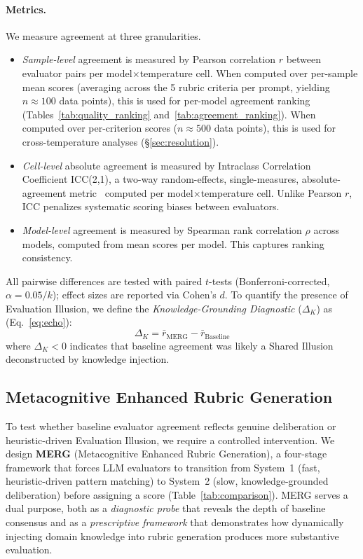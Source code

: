 \documentclass{article}
\begin{document}
\paragraph{Metrics.} We measure agreement at three granularities.
\begin{itemize}
    \item \textit{Sample-level} agreement is measured by Pearson correlation $r$ between evaluator pairs per model$\times$temperature cell. When computed over per-sample mean scores (averaging across the 5 rubric criteria per prompt, yielding $n \approx 100$ data points), this is used for per-model agreement ranking (Tables~\ref{tab:quality_ranking} and~\ref{tab:agreement_ranking}). When computed over per-criterion scores ($n \approx 500$ data points), this is used for cross-temperature analyses (\S\ref{sec:resolution}).
    \item \textit{Cell-level} absolute agreement is measured by Intraclass Correlation Coefficient ICC(2,1), a two-way random-effects, single-measures, absolute-agreement metric~\citep{shrout1979intraclass} computed per model$\times$temperature cell. Unlike Pearson $r$, ICC penalizes systematic scoring biases between evaluators.
    \item \textit{Model-level} agreement is measured by Spearman rank correlation $\rho$ across models, computed from mean scores per model. This captures ranking consistency.
\end{itemize}
All pairwise differences are tested with paired $t$-tests (Bonferroni-corrected, $\alpha = 0.05/k$); effect sizes are reported via Cohen's $d$. To quantify the presence of Evaluation Illusion, we define the \textit{Knowledge-Grounding Diagnostic} ($\Delta_K$) as (Eq.~\ref{eq:echo}):
\begin{equation}
\label{eq:echo}
\Delta_K = \bar{r}_{\text{MERG}} - \bar{r}_{\text{Baseline}}
\end{equation}
where $\Delta_K < 0$ indicates that baseline agreement was likely a Shared Illusion deconstructed by knowledge injection.

\subsection{Metacognitive Enhanced Rubric Generation}
\label{sec:merg}

To test whether baseline evaluator agreement reflects genuine deliberation or heuristic-driven Evaluation Illusion, we require a controlled intervention. We design \textbf{MERG} (Metacognitive Enhanced Rubric Generation), a four-stage framework that forces LLM evaluators to transition from System~1 (fast, heuristic-driven pattern matching) to System~2 (slow, knowledge-grounded deliberation) before assigning a score (Table~\ref{tab:comparison}). MERG serves a dual purpose, both as a \textit{diagnostic probe} that reveals the depth of baseline consensus and as a \textit{prescriptive framework} that demonstrates how dynamically injecting domain knowledge into rubric generation produces more substantive evaluation.
\end{document}
